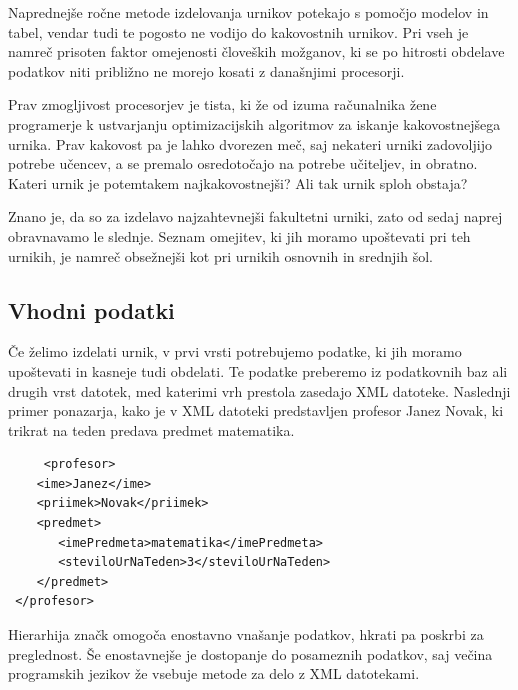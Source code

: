 \documentclass[a4paper, 10pt]{article}
\begin{document}
Naprednejše ročne metode izdelovanja urnikov potekajo s pomočjo modelov in tabel, vendar
tudi te pogosto ne vodijo do kakovostnih urnikov. Pri vseh je namreč prisoten faktor
omejenosti človeških možganov, ki se po hitrosti obdelave podatkov niti približno ne
morejo kosati z današnjimi procesorji.

Prav zmogljivost procesorjev je tista, ki že od izuma računalnika žene programerje k
ustvarjanju optimizacijskih algoritmov za iskanje kakovostnejšega urnika. Prav kakovost
pa je lahko dvorezen meč, saj nekateri urniki zadovoljijo potrebe učencev, a se premalo
osredotočajo na potrebe učiteljev, in obratno. Kateri urnik je potemtakem najkakovostnejši?
Ali tak urnik sploh obstaja?

Znano je, da so za izdelavo najzahtevnejši fakultetni urniki, zato od sedaj naprej
obravnavamo le slednje. Seznam omejitev, ki jih moramo upoštevati pri teh urnikih,
je namreč obsežnejši kot pri urnikih osnovnih in srednjih šol.

\subsection{Vhodni podatki }%

Če želimo izdelati urnik, v prvi vrsti potrebujemo podatke, ki jih moramo upoštevati in
kasneje tudi obdelati. Te podatke preberemo iz podatkovnih baz ali drugih vrst datotek,
med katerimi vrh prestola zasedajo XML datoteke. Naslednji primer ponazarja, kako je v
XML datoteki predstavljen profesor Janez Novak, ki trikrat na teden predava predmet
matematika.


\begin{verbatim}
	 <profesor>
    <ime>Janez</ime>
    <priimek>Novak</priimek>
    <predmet>
       <imePredmeta>matematika</imePredmeta>
       <steviloUrNaTeden>3</steviloUrNaTeden>
    </predmet>
 </profesor>
\end{verbatim}
%
Hierarhija značk omogoča enostavno vnašanje podatkov, hkrati pa poskrbi za preglednost.
Še enostavnejše je dostopanje do posameznih podatkov, saj večina programskih jezikov že
vsebuje metode za delo z XML datotekami.
\end{document}
